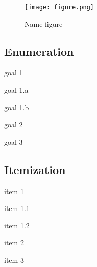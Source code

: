\begin{figure}[H]
\begin{center}\texttt{[image: figure.png]}\end{center}
\caption{Name figure}\label{fig:figure}
\end{figure}
\subsection{Enumeration}
\begin{my_enumerate}
	\item {goal 1}
	\begin{my_enumerate}
		\item {goal 1.a}
		\item {goal 1.b}
	\end{my_enumerate}
	\item {goal 2}
	\item {goal 3}
\end{my_enumerate}
\subsection{Itemization}
\begin{my_itemize}
	\item {item 1}
	\begin{my_itemize}
		\item {item 1.1}
		\item {item 1.2}
	\end{my_itemize}
	\item {item 2}
	\item {item 3}
\end{my_itemize}








